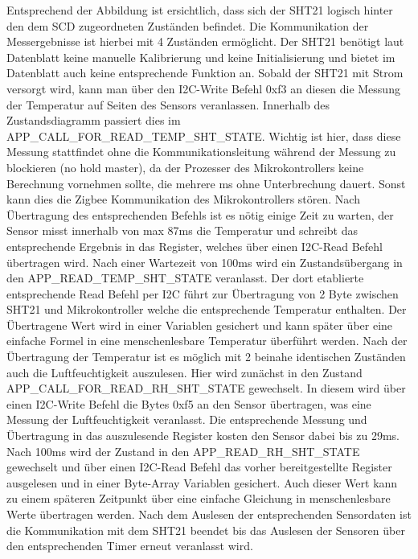 \documentclass[]{article}
\begin{document}
		Entsprechend der Abbildung ist ersichtlich, dass sich der SHT21 logisch hinter den dem SCD zugeordneten Zuständen befindet. Die Kommunikation der Messergebnisse ist hierbei mit 4 Zuständen ermöglicht. Der SHT21 benötigt laut Datenblatt keine manuelle Kalibrierung und keine Initialisierung und bietet im Datenblatt auch keine entsprechende Funktion an. Sobald der SHT21 mit Strom versorgt wird, kann man über den I2C-Write Befehl 0xf3 an diesen die Messung der Temperatur auf Seiten des Sensors veranlassen. Innerhalb des Zustandsdiagramm passiert dies im APP\_CALL\_FOR\_READ\_TEMP\_SHT\_STATE. Wichtig ist hier, dass diese Messung stattfindet ohne die Kommunikationsleitung während der Messung zu blockieren (no hold master), da der Prozesser des Mikrokontrollers keine Berechnung vornehmen sollte, die mehrere ms ohne Unterbrechung dauert. Sonst kann dies die Zigbee Kommunikation des Mikrokontrollers stören. Nach Übertragung des entsprechenden Befehls ist es nötig einige Zeit zu warten, der Sensor misst innerhalb von max 87ms die Temperatur und schreibt das entsprechende Ergebnis in das Register, welches über einen I2C-Read Befehl übertragen wird. Nach einer Wartezeit von 100ms wird ein Zustandsübergang in den APP\_READ\_TEMP\_SHT\_STATE veranlasst. Der dort etablierte entsprechende Read Befehl per I2C führt zur Übertragung von 2 Byte zwischen SHT21 und Mikrokontroller welche die entsprechende Temperatur enthalten. Der Übertragene Wert wird in einer Variablen gesichert und kann später über eine einfache Formel in eine menschenlesbare Temperatur überführt werden. Nach der Übertragung der Temperatur ist es möglich mit 2 beinahe identischen Zuständen auch die Luftfeuchtigkeit auszulesen. Hier wird zunächst in den Zustand APP\_CALL\_FOR\_READ\_RH\_SHT\_STATE gewechselt. In diesem wird über einen I2C-Write Befehl die Bytes 0xf5 an den Sensor übertragen, was eine Messung der Luftfeuchtigkeit veranlasst. Die entsprechende Messung und Übertragung in das auszulesende Register kosten den Sensor dabei bis zu 29ms. Nach 100ms wird der Zustand in den APP\_READ\_RH\_SHT\_STATE gewechselt und über einen I2C-Read Befehl das vorher bereitgestellte Register ausgelesen und in einer Byte-Array Variablen gesichert. Auch dieser Wert kann zu einem späteren Zeitpunkt über eine einfache Gleichung in menschenlesbare Werte übertragen werden. Nach dem Auslesen der entsprechenden Sensordaten ist die Kommunikation mit dem SHT21 beendet bis das Auslesen der Sensoren über den entsprechenden Timer erneut veranlasst wird.
		
\end{document}
